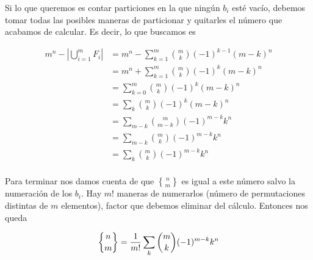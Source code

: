\documentclass{article}
\newcommand{\stirlingD}[2]{\genfrac{\{}{\}}{0pt}{}{#1}{#2}}
\begin{document}
Si lo que queremos es contar particiones en la que ningún $b_i$ esté
vacío, debemos tomar todas las posibles maneras de particionar y quitarles el
número que acabamos de calcular. Es decir, lo que buscamos es

\begin{align*}
m^n - \left| \bigcup_{i=1}^m F_i \right|
  & = m^n - \sum_{k=1}^m \binom{m}{k} (-1)^{k-1} (m-k)^n \\
  & = m^n + \sum_{k=1}^m \binom{m}{k} (-1)^{k} (m-k)^n \\
  & = \sum_{k=0}^m \binom{m}{k} (-1)^{k} (m-k)^n \\
  & = \sum_k \binom{m}{k} (-1)^{k} (m-k)^n \\
  & = \sum_{m-k} \binom{m}{m-k} (-1)^{m-k} k^n \\
  & = \sum_{m-k} \binom{m}{k} (-1)^{m-k} k^n \\
  & = \sum_k \binom{m}{k} (-1)^{m-k} k^n \\
\end{align*}

Para terminar nos damos cuenta de que $\stirlingD{n}{m}$ es igual a este
número salvo la numeración de los $b_i$. Hay $m!$ maneras de numerarlos
(número de permutaciones distintas de $m$ elementos), factor que
debemos eliminar del cálculo. Entonces nos queda

\[
\stirlingD{n}{m} = \frac{1}{m!} \sum_k \binom{m}{k} (-1)^{m-k} k^n \\
\]

\section{}

\section{}
\end{document}
